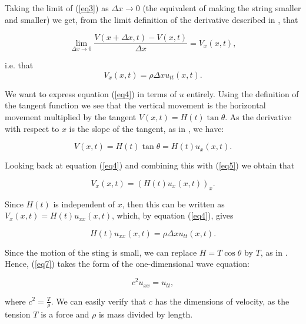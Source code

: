 \documentclass[a4paper, 12pt]{article}
\numberwithin{equation}{section}
\begin{document}
 Taking the limit of (\ref{eq3}) as $\Delta x \rightarrow 0$ (the equivalent of
 making the string smaller and smaller) we get, from the limit definition of the
 derivative described in \cite{Spi}, that 

 \begin{equation*}
    \lim_{\Delta x \rightarrow 0}\frac{V(x+\Delta x,t)-V(x,t)}{\Delta x}=V_x(x,t),
 \end{equation*}

i.e. that 
\begin {equation} \label{eq4}
    V_x(x,t)=\rho\Delta x u_{tt} (x,t).
\end{equation}

We want to express equation (\ref{eq4}) in terms of $u$ entirely. Using the
definition of the tangent function we see that the vertical movement is the
horizontal movement multiplied by the tangent $V(x, t)=H(t)\tan{\theta}$. As the
derivative with respect to $x$ is the slope of the tangent, as in \cite{Spi}, we
have:

\begin{equation} \label{eq5}
    V(x,t)=H(t)\tan{\theta}=H(t)u_x(x,t).
\end{equation}

Looking back at equation (\ref{eq4}) and combining this with (\ref{eq5}) we
obtain that

\begin{equation*} 
    V_x(x,t)=(H(t)u_x(x,t))_x.
\end{equation*}

Since $H(t)$ is independent of $x$, then this can be written as
$V_x(x,t)=H(t)u_{xx}(x,t)$, which, by equation (\ref{eq4}), gives

\begin {equation} \label{eq7}
    H(t)u_{xx}(x, t)=\rho\Delta x u_{tt}(x,t).
\end{equation}

Since the motion of the sting is small, we can replace $H=T\cos{\theta}$ by $T$,
as in \cite{BoyDiP}. Hence, (\ref{eq7}) takes the form of the one-dimensional
wave equation:

\begin{equation} \label{wave}
    c^2u_{xx}=u_{tt}, 
\end{equation}

where $c^2=\frac{T}{\rho}$. We can easily verify that $c$ has the dimensions of
velocity, as the tension $T$ is a force and $\rho$ is mass divided by length.
\end{document}
